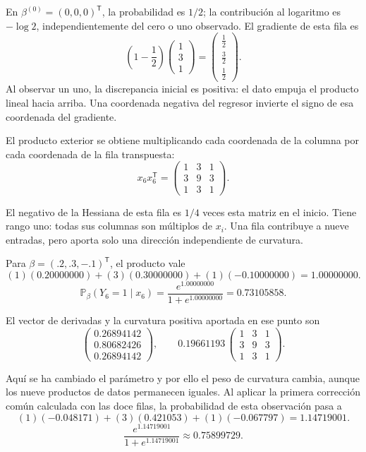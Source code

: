\documentclass[11pt,a4paper]{article}
\newcommand{\Prob}{\mathbb P}
\newcommand{\T}{^{\mathsf T}}
\begin{document}
En \(\beta^{(0)}=(0,0,0)\T\), la probabilidad es \(1/2\);
la contribución al logaritmo es \(-\log2\), independientemente
del cero o uno observado. El gradiente de esta fila es
\[
\left(1-\frac12\right)\begin{pmatrix}1\\3\\1\end{pmatrix}=\begin{pmatrix}\frac{1}{2}\\\frac{3}{2}\\\frac{1}{2}\end{pmatrix}.
\]
Al observar un uno, la discrepancia inicial es positiva: el dato empuja el producto lineal hacia arriba. Una coordenada negativa del regresor invierte el signo de esa coordenada del gradiente.

El producto exterior se obtiene multiplicando cada coordenada
de la columna por cada coordenada de la fila transpuesta:
\[
x_{6}x_{6}\T=\begin{pmatrix}1&3&1\\3&9&3\\1&3&1\end{pmatrix}.
\]

El negativo de la Hessiana de esta fila es \(1/4\)
veces esta matriz en el inicio. Tiene rango uno:
todas sus columnas son múltiplos de \(x_i\).
Una fila contribuye a nueve entradas, pero aporta
solo una dirección independiente de curvatura.

Para \(\beta=(.2,.3,-.1)\T\), el producto vale
\[
(1)(0.20000000)+(3)(0.30000000)+(1)(-0.10000000)=1.00000000.
\]
\[
\Prob_\beta(Y_{6}=1\mid x_{6})=\frac{e^{1.00000000}}{1+e^{1.00000000}}=0.73105858.
\]

El vector de derivadas y la curvatura positiva aportada
en ese punto son
\[
\begin{pmatrix}0.26894142\\0.80682426\\0.26894142\end{pmatrix},\qquad 0.19661193\,\begin{pmatrix}1&3&1\\3&9&3\\1&3&1\end{pmatrix}.
\]

Aquí se ha cambiado el parámetro y por ello el peso de
curvatura cambia, aunque los nueve productos de datos
permanecen iguales.
Al aplicar la primera corrección común calculada con las doce filas,
la probabilidad de esta observación pasa a
\[
(1)(-0.048171)+(3)(0.421053)+(1)(-0.067797)=1.14719001.
\]
\[
\frac{e^{1.14719001}}{1+e^{1.14719001}}\approx0.75899729.
\]
\end{document}
